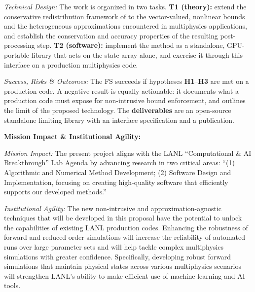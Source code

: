 \documentclass[12pt,twoside]{paper}
\begin{document}
\vspace*{0.5\baselineskip}

\textit{Technical Design:} The work is organized in two tasks. \textbf{T1 (theory):}
extend the conservative redistribution framework of
\cite{Guermond_arxiv_2026} to the vector-valued, nonlinear bounds and the
heterogeneous approximations encountered in multiphysics applications, and
establish the conservation and accuracy properties of the resulting
post-processing step. \textbf{T2 (software):} implement the method as a
standalone, GPU-portable library that acts on the state array alone, and
exercise it through this interface on a production multiphysics code.

\vspace*{0.5\baselineskip}

\textit{Success, Risks \& Outcomes:} The FS succeeds if hypotheses
{\bfseries H1}--{\bfseries H3} are met on a production code.  A negative
result is equally actionable: it documents what a production code must
expose for non-intrusive bound enforcement, and outlines the limit of the
proposed technology. The {\bfseries deliverables} are an open-source
standalone limiting library with an interface specification and a
publication.




\vspace*{0.5\baselineskip}
\textbf{Mission Impact \& Institutional Agility:}
\vspace*{0.5\baselineskip}


\textit{Mission Impact:} The present project aligns with the LANL
``Computational \& AI Breakthrough'' Lab Agenda by advancing research in
two critical areas: ``(1) Algorithmic and Numerical Method Development; (2)
Software Design and Implementation, focusing on creating high-quality
software that efficiently supports our developed methods.''

\vspace*{0.5\baselineskip}

\textit{Institutional Agility:} The new non-intrusive and
approximation-agnostic techniques that will be developed in this proposal
have the potential to unlock the capabilities of existing LANL production
codes. Enhancing the robustness of forward and reduced-order simulations
will increase the reliability of automated runs over large parameter sets
and will help tackle complex multiphysics simulations with greater
confidence. Specifically, developing robust forward simulations that
maintain physical states across various multiphysics scenarios will
strengthen LANL's ability to make efficient use of machine learning and AI
tools.
\end{document}
